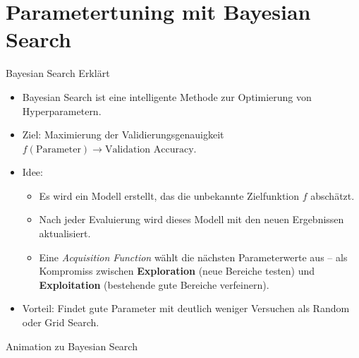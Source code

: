 \section{Parametertuning mit Bayesian Search}

\begin{frame}{Bayesian Search Erklärt}
\begin{itemize}
    \item Bayesian Search ist eine intelligente Methode zur Optimierung von Hyperparametern.
    \item Ziel: Maximierung der Validierungsgenauigkeit $f(\text{Parameter}) \rightarrow \text{Validation Accuracy}$.
    \item Idee:
        \begin{itemize}
            \item Es wird ein Modell erstellt, das die unbekannte Zielfunktion $f$ abschätzt.
            \item Nach jeder Evaluierung wird dieses Modell mit den neuen Ergebnissen aktualisiert.
            \item Eine \textit{Acquisition Function} wählt die nächsten Parameterwerte aus – als Kompromiss zwischen \textbf{Exploration} (neue Bereiche testen) und \textbf{Exploitation} (bestehende gute Bereiche verfeinern).
        \end{itemize}
    \item Vorteil: Findet gute Parameter mit deutlich weniger Versuchen als Random oder Grid Search.
\end{itemize}
\end{frame}

\begin{frame}{Animation zu Bayesian Search}
\centering
{}
\end{frame}

